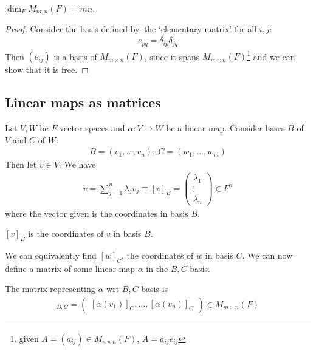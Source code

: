     \begin{proposition}
        $\dim_F M_{m,n}(F) = m n$.
    \end{proposition}

    \begin{proof}
        Consider the basis defined by, the `elementary matrix' for all $i,j$:
        \begin{align*}
            e_{pq} = \delta_{ip}\delta_{jq}
        \end{align*}
        Then $(e_{ij})$ is a basis of $M_{m \times n}(F)$, since it spans $M_{m \times n}(F)$\footnote{given $A = (a_{ij}) \in M_{n \times n}(F)$, $A = a_{ij} e_{ij}$} and we can show that it is free.
    \end{proof}

    \subsection{Linear maps as matrices}
    Let $V, W$ be $F$-vector spaces and $\alpha : V \to W$ be a linear map.
    Consider bases $B$ of $V$ and $C$ of $W$:
    \begin{align*}
        B = (v_1, \dots, v_n);\ C = (w_1, \dots, w_m)
    \end{align*}
    Then let $v \in V$.
    We have
    \begin{align*}
        v = \sum_{j=1}^n \lambda_j v_j \equiv [v]_B = \begin{pmatrix}
            \lambda_1 \\ \vdots \\ \lambda_n
        \end{pmatrix} \in F^n
    \end{align*}
    where the vector given is the coordinates in basis $B$.
    \begin{notation}
        $[v]_B$ is the coordinates of $v$ in basis $B$.
    \end{notation} 
    We can equivalently find $[w]_C$, the coordinates of $w$ in basis $C$.
    We can now define a matrix of some linear map $\alpha$ in the $B, C$ basis.
    \begin{definition}
        The matrix representing $\alpha$ wrt $B, C$ basis is
        \begin{align*}
            [\alpha]_{B,C} = \begin{pmatrix}
                [\alpha(v_1)]_C, \dots, [\alpha(v_n)]_C
            \end{pmatrix} \in M_{m\times n}(F)
        \end{align*}
    \end{definition}

